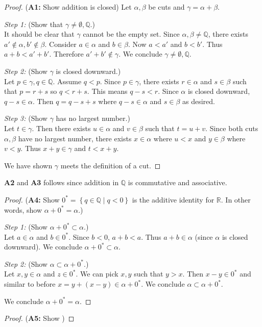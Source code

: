 \documentclass[../main.tex]{subfiles}
\begin{document}
\begin{proof}[Proof]
    (\textbf{A1:} Show addition is closed)
    Let \( \alpha, \beta \) be cuts and \( \gamma = \alpha + \beta \).

    \emph{Step 1:} (Show that \( \gamma \neq \emptyset, \mathbb{Q} \).) \\
    It should be clear that \( \gamma \) cannot be the empty set.
    Since \( \alpha, \beta \neq \mathbb{Q} \), there exists \( a' \notin \alpha, b' \notin \beta \).
    Consider \( a \in \alpha \) and \( b \in \beta \). Now \( a < a' \) and \( b < b' \). Thus \( a + b < a' + b' \).
    Therefore \( a' + b' \notin \gamma \). We conclude \( \gamma \neq \emptyset, \mathbb{Q} \). \checkmark

    \emph{Step 2:} (Show \( \gamma \) is closed downward.) \\
    Let \( p \in \gamma, q \in \mathbb{Q} \). Assume \( q < p \).
    Since \( p \in  \gamma \), there exists \( r \in \alpha \) and \( s \in \beta \) such that \( p = r+s \) so \( q < r+s \).
    This means \( q-s < r \). Since \( \alpha \) is closed downward, \( q-s \in \alpha \).
    Then \( q = q-s +s \) where \( q-s \in \alpha \) and \( s \in \beta \) as desired.

    \emph{Step 3:} (Show \( \gamma \) has no largest number.) \\
    Let \( t \in \gamma \). Then there exists \( u \in \alpha \) and \( v \in \beta \) such that \( t = u + v \).
    Since both cuts \( \alpha, \beta \) have no largest number, there exists \( x \in \alpha \) where \( u < x \) and \( y \in \beta \) where \( v < y \).
    Thus \( x + y \in \gamma \) and \( t < x + y \). \checkmark

    We have shown \( \gamma \) meets the definition of a cut.
\end{proof}

\textbf{A2} and \textbf{A3} follows since addition in \( \mathbb{Q} \) is commutative and associative.
    
\begin{proof}[Proof]
    (\textbf{A4:} Show \( 0^* =\left\{ q \in \mathbb{Q} \mid q < 0 \right\}\) is the additive identity for \( \mathbb{R} \). 
    In other words, show \( \alpha + 0^* = \alpha \).) 

    \emph{Step 1:} (Show \( \alpha + 0^* \subset \alpha \).) \\
    Let \( a \in \alpha \) and \( b \in 0^* \).
    Since \( b < 0 \), \( a + b < a \).
    Thus \( a + b \in \alpha \) (since \( \alpha \) is closed downward).
    We conclude \( \alpha + 0^* \subset \alpha \).

    \emph{Step 2:} (Show \( \alpha \subset \alpha + 0^* \).) \\
    Let \( x,y \in \alpha \) and \( z \in 0^* \). We can pick \( x,y \) such that \( y > x \). Then \( x - y \in 0^* \)
    and similar to before \( x = y + (x - y) \in \alpha + 0^* \).
    We conclude \( \alpha \subset \alpha + 0^* \). \checkmark

    We conclude \( \alpha + 0^* = \alpha \).
\end{proof}

\begin{proof}[Proof]
    (\textbf{A5:} Show )
\end{proof}
\end{document}
